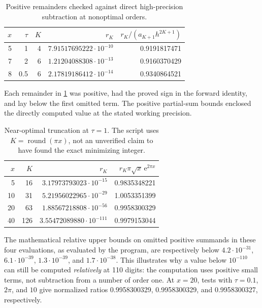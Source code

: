 \documentclass[11pt,a4paper]{article}
\theoremstyle{definition}
\theoremstyle{remark}
\newcommand{\e}{\mathrm e}
\begin{document}
\begin{table}[htbp]
\centering
\caption{Positive remainders checked against direct high-precision
subtraction at nonoptimal orders.}
\label{tab:positive}
\begin{tabular}{@{}rrrrr@{}}
\toprule
$x$&$\tau$&$K$&$r_K$&$r_K/(a_{K+1}h^{2K+1})$\\
\midrule
5&1&4&$7.91517695222\cdot10^{-10}$&0.9191817471\\
7&2&6&$1.21204088308\cdot10^{-13}$&0.9160370429\\
8&0.5&6&$2.17819186412\cdot10^{-14}$&0.9340864521\\
\bottomrule
\end{tabular}
\end{table}
Each remainder in \cref{tab:positive} was positive, had the proved sign in
the forward identity, and lay below the first omitted term. The positive
partial-sum bounds enclosed the directly computed value at the stated
working precision.

\begin{table}[htbp]
\centering
\caption{Near-optimal truncation at $\tau=1$. The script uses
$K=\operatorname{round}(\pi x)$, not an unverified claim to have found the
exact minimizing integer.}
\label{tab:optimal}
\begin{tabular}{@{}rrrr@{}}
\toprule
$x$&$K$&$r_K$&$r_K\pi\sqrt{x}\,\e^{2\pi x}$\\
\midrule
5&16&$3.17973793023\cdot10^{-15}$&0.9835348221\\
10&31&$5.21956022965\cdot10^{-29}$&1.0053351399\\
20&63&$1.88567218808\cdot10^{-56}$&0.9958300329\\
40&126&$3.55472089880\cdot10^{-111}$&0.9979153044\\
\bottomrule
\end{tabular}
\end{table}
The mathematical relative upper bounds on omitted positive summands in
these four evaluations, as evaluated by the program, are respectively
below $4.2\cdot10^{-31}$, $6.1\cdot10^{-39}$, $1.3\cdot10^{-39}$, and
$1.7\cdot10^{-38}$. This illustrates why a value below $10^{-110}$ can
still be computed \emph{relatively} at 110 digits: the computation uses
positive small terms, not subtraction from a number of order one.
At $x=20$, tests with $\tau=0.1$, $2\pi$, and $10$ give normalized ratios
0.9958300329, 0.9958300329, and 0.9958300327, respectively.
\end{document}
